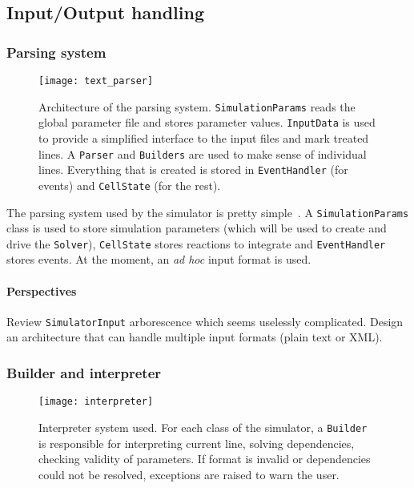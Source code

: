 
\subsection{Input/Output handling}

\subsubsection{Parsing system}

\begin{figure}[!h]
  \centering
  \texttt{[image: text\_parser]}
  \caption{Architecture of the parsing system. \texttt{SimulationParams} reads the global parameter file and stores parameter values. \texttt{InputData} is used to provide a simplified interface to the input files and mark treated lines. A \texttt{Parser} and \texttt{Builders} are used to make sense of individual lines. Everything that is created is stored in \texttt{EventHandler} (for events) and \texttt{CellState} (for the rest). }
  \label{fig:text_parser}
\end{figure}

The parsing system used by the simulator is pretty simple~. A \texttt{SimulationParams} class is used to store simulation parameters (which will be used to create and drive the \texttt{Solver}), \texttt{CellState} stores reactions to integrate and \texttt{EventHandler} stores events. At the moment, an \textit{ad hoc} input format is used.

\paragraph{Perspectives} Review \texttt{SimulatorInput} arborescence which seems uselessly complicated. Design an architecture that can handle multiple input formats (plain text or XML).

\subsubsection{Builder and interpreter}

\begin{figure}[!h]
  \centering
  \texttt{[image: interpreter]}
  \caption{Interpreter system used. For each class of the simulator, a \texttt{Builder} is responsible for interpreting current line, solving dependencies, checking validity of parameters. If format is invalid or dependencies could not be resolved, exceptions are raised to warn the user.}
  \label{fig:interpreter}
\end{figure}

